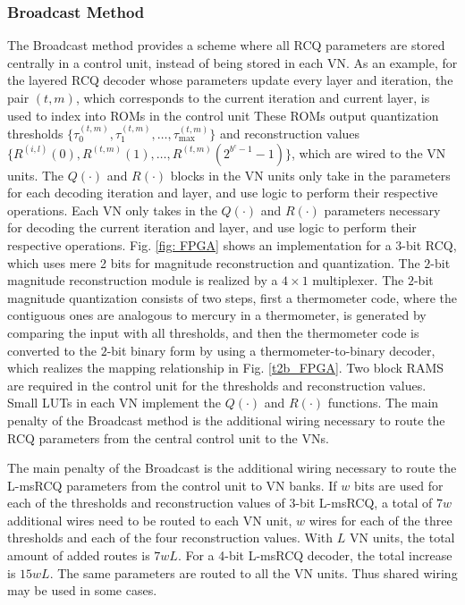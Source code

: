 \documentclass [PhD] {uclathes}
\begin{document}
\subsubsection{Broadcast Method}
The Broadcast method provides a scheme where all RCQ parameters are stored centrally in a control unit, instead of being stored in each VN.  
As an example, for the layered RCQ decoder whose parameters update every layer and iteration, the pair $(t,m)$, which corresponds to the current iteration and current layer, is used to index into ROMs in the control unit
These ROMs output quantization thresholds $\{\tau^{(t,m)}_0, \tau^{(t,m)}_1, \dots , \tau^{(t,m)}_{\text{max}}\}$ and reconstruction values $\{R^{(i,l)}(0), R^{(t,m)}(1), \dots , R^{(t,m)}(2^{b^c-1}-1)\}$, which are wired to the VN units. 
The $Q(\cdot)$ and $R(\cdot)$ blocks in the VN units only take in the parameters for each decoding iteration and layer, and use logic to perform their respective operations. 
Each VN only takes in the $Q(\cdot)$ and $R(\cdot)$ parameters necessary for decoding the current iteration and layer, and use logic to perform their respective operations. Fig. \ref{fig: FPGA} shows an implementation for a 3-bit RCQ, which uses mere 2 bits for magnitude reconstruction and quantization.
The $2$-bit magnitude reconstruction module  is realized by a $4\times1$ multiplexer. The $2$-bit magnitude quantization consists of two steps, first a  thermometer code\cite{Ajanya2018-uy}, where the contiguous ones are analogous to mercury in a thermometer, is generated by comparing the input with all thresholds, and then the thermometer code is converted to the  $2$-bit binary form by using a thermometer-to-binary decoder, which realizes the mapping relationship in Fig. \ref{t2b_FPGA}. 
Two block RAMS are required in the control unit for the thresholds and reconstruction values. Small LUTs in each VN implement the $Q(\cdot)$ and $R(\cdot)$ functions. The main penalty of the Broadcast method is the additional wiring necessary to route the RCQ parameters from the central control unit to the VNs.

The main penalty of the Broadcast is the additional wiring necessary to route the L-msRCQ parameters from the control unit to VN banks. If $w$ bits are used for each of the thresholds and reconstruction values of 3-bit L-msRCQ, a total of $7w$ additional wires need to be routed to each VN unit, $w$ wires for each of the three thresholds and each of the four reconstruction values.  With $L$ VN units, the total amount of added routes is $7wL$. For a 4-bit L-msRCQ decoder, the total increase is $15wL$. The same parameters are routed to all the VN units.  Thus shared wiring may be used in some cases.
\end{document}
